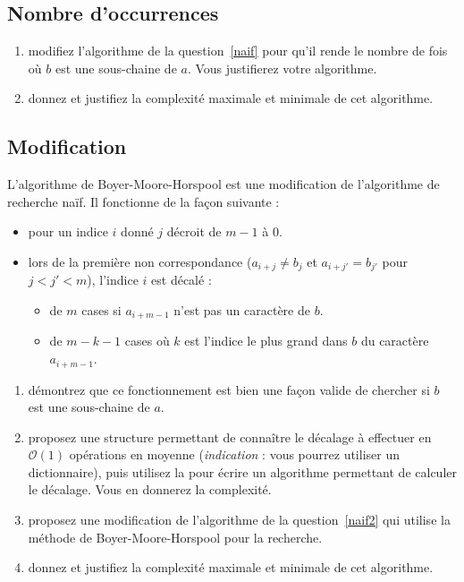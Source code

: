 \documentclass
[12pt]
{article}
\begin{document}
\subsection{Nombre d'occurrences\label{naif2}}

\begin{enumerate}
    \item modifiez l'algorithme de la question~\ref{naif} pour qu'il rende le nombre de fois où $b$ est une sous-chaine de $a$. Vous justifierez votre algorithme.
    \item donnez et justifiez la complexité maximale et minimale de cet algorithme.
\end{enumerate}

\subsection{Modification}

L'algorithme de Boyer-Moore-Horspool est une modification de l'algorithme de recherche naïf. Il fonctionne de la façon suivante :

\begin{itemize}
    \item pour un indice $i$ donné $j$ décroit de $m-1$ à $0$.
    \item lors de la première non correspondance ($a_{i + j} \neq b_j$ et $a_{i + j'} = b_{j'}$ pour $j < j' < m$), l'indice $i$ est décalé :
    \begin{itemize}
        \item de $m$ cases si $a_{i +m-1}$ n'est pas un caractère de $b$.
        \item de $m-k-1$ cases où $k$ est l'indice le plus grand dans $b$ du caractère $a_{i + m -1}$.
    \end{itemize}
\end{itemize}

\begin{enumerate}
    \item démontrez que ce fonctionnement est bien une façon valide de chercher si $b$ est une sous-chaine de $a$.
    \item proposez une structure permettant de connaître le décalage à effectuer en $\mathcal{O}(1)$ opérations en moyenne ({\em indication} : vous pourrez utiliser un dictionnaire), puis utilisez la pour écrire un algorithme permettant de calculer le décalage. Vous en donnerez la complexité.
    \item proposez une modification de l'algorithme de la question~\ref{naif2} qui utilise la méthode de Boyer-Moore-Horspool pour la recherche.
    \item donnez et justifiez la complexité maximale et minimale de cet algorithme.
\end{enumerate}
\end{document}
